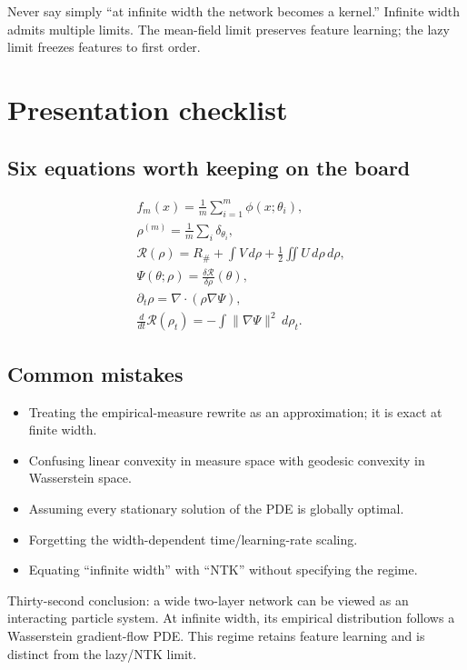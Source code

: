 \documentclass[11pt,a4paper,oneside,openany]{memoir}
\theoremstyle{definition}
\begin{document}
\begin{presentbox}
Never say simply ``at infinite width the network becomes a kernel.''  Infinite width admits multiple limits.  The mean-field limit preserves feature learning; the lazy limit freezes features to first order.
\end{presentbox}

\chapter{Presentation checklist}
\section{Six equations worth keeping on the board}
\begin{align*}
&f_m(x)=\frac1m\sum_{i=1}^m\phi(x;\theta_i),\\
&\rho^{(m)}=\frac1m\sum_i\delta_{\theta_i},\\
&\mathcal R(\rho)=R_\#+\int V\,d\rho+\frac12\iint U\,d\rho\,d\rho,\\
&\Psi(\theta;\rho)=\frac{\delta\mathcal R}{\delta\rho}(\theta),\\
&\partial_t\rho=\nabla\cdot(\rho\nabla\Psi),\\
&\frac{d}{dt}\mathcal R(\rho_t)
=-\int\|\nabla\Psi\|^2\,d\rho_t.
\end{align*}

\section{Common mistakes}
\begin{itemize}
\item Treating the empirical-measure rewrite as an approximation; it is exact at finite width.
\item Confusing linear convexity in measure space with geodesic convexity in Wasserstein space.
\item Assuming every stationary solution of the PDE is globally optimal.
\item Forgetting the width-dependent time/learning-rate scaling.
\item Equating ``infinite width'' with ``NTK'' without specifying the regime.
\end{itemize}

\begin{presentbox}
Thirty-second conclusion: a wide two-layer network can be viewed as an interacting particle system.  At infinite width, its empirical distribution follows a Wasserstein gradient-flow PDE.  This regime retains feature learning and is distinct from the lazy/NTK limit.
\end{presentbox}
\end{document}

